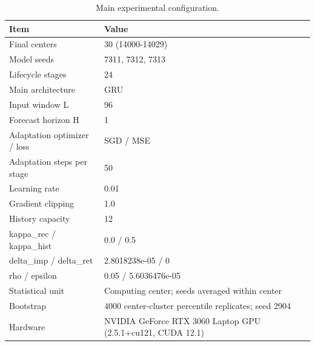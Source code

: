 \begin{table}[t]
\centering
\small
\caption{Main experimental configuration.}
\label{tab:main_configuration}
\begin{tabular}{ll}
\toprule
Item & Value \\
\midrule
Final centers & 30 (14000-14029) \\
Model seeds & 7311, 7312, 7313 \\
Lifecycle stages & 24 \\
Main architecture & GRU \\
Input window L & 96 \\
Forecast horizon H & 1 \\
Adaptation optimizer / loss & SGD / MSE \\
Adaptation steps per stage & 50 \\
Learning rate & 0.01 \\
Gradient clipping & 1.0 \\
History capacity & 12 \\
kappa\_rec / kappa\_hist & 0.0 / 0.5 \\
delta\_imp / delta\_ret & 2.8018238e-05 / 0 \\
rho / epsilon & 0.05 / 5.6036476e-05 \\
Statistical unit & Computing center; seeds averaged within center \\
Bootstrap & 4000 center-cluster percentile replicates; seed 2904 \\
Hardware & NVIDIA GeForce RTX 3060 Laptop GPU (2.5.1+cu121, CUDA 12.1) \\
\bottomrule
\end{tabular}
\end{table}
